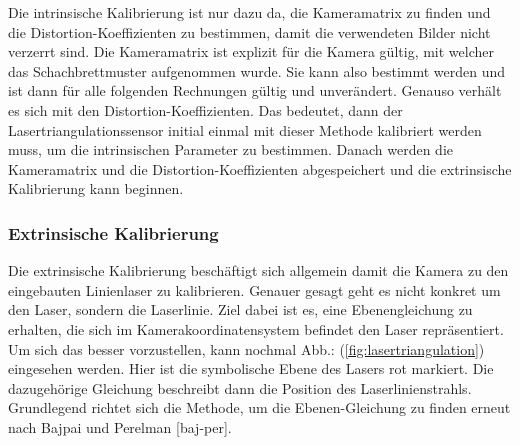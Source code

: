		Die intrinsische Kalibrierung ist nur dazu da, die Kameramatrix zu finden und die Distortion-Koeffizienten zu bestimmen, damit die verwendeten Bilder nicht verzerrt sind. Die Kameramatrix ist explizit für die Kamera gültig, mit welcher das Schachbrettmuster aufgenommen wurde. Sie kann also bestimmt werden und ist dann für alle folgenden Rechnungen gültig und unverändert. Genauso verhält es sich mit den Distortion-Koeffizienten. Das bedeutet, dann der Lasertriangulationssensor initial einmal mit dieser Methode kalibriert werden muss, um die intrinsischen Parameter zu bestimmen. Danach werden die Kameramatrix und die Distortion-Koeffizienten abgespeichert und die extrinsische Kalibrierung kann beginnen. 
			\label{chap:kalibrierung_intrinsisch}
			
		\newpage
		\subsubsection{Extrinsische Kalibrierung}
		Die extrinsische Kalibrierung beschäftigt sich allgemein damit die Kamera zu den eingebauten Linienlaser zu kalibrieren. Genauer gesagt geht es nicht konkret um den Laser, sondern die Laserlinie. Ziel dabei ist es, eine Ebenengleichung zu erhalten, die sich im Kamerakoordinatensystem befindet den Laser repräsentiert. Um sich das besser vorzustellen, kann nochmal Abb.: (\ref{fig:lasertriangulation}) eingesehen werden. Hier ist die symbolische Ebene des Lasers rot markiert. Die dazugehörige Gleichung beschreibt dann die Position des Laserlinienstrahls. Grundlegend richtet sich die Methode, um die Ebenen-Gleichung zu finden erneut nach Bajpai und Perelman [baj-per]. \newline
